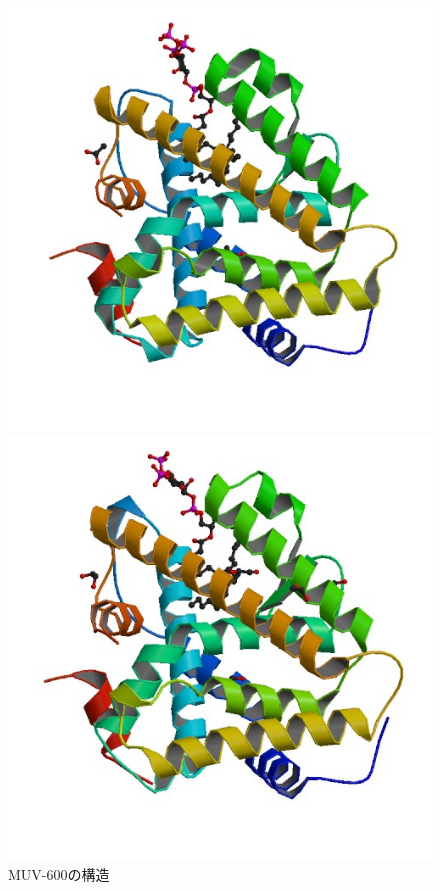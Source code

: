 \documentclass[a4j,11pt]{jarticle}
\begin{document}
\begin{figure}[H]
\begin{minipage}{0.5\hsize}
\begin{center}
		\end{center}
	\end{minipage}
	\\
	\begin{minipage}{0.5\hsize}
		\begin{center}
			\includegraphics[width=12cm, bb=0 0 500 500]{../pictures/MUV-600/3.jpg}
		\end{center}
	\end{minipage}
	\begin{minipage}{0.5\hsize}
		\begin{center}
			\includegraphics[width=12cm, bb=0 0 500 500]{../pictures/MUV-600/4.jpg}
		\end{center}
	\end{minipage}
	\caption{MUV-600の構造} \label{muv-600-fig}
\end{figure}
\end{document}
